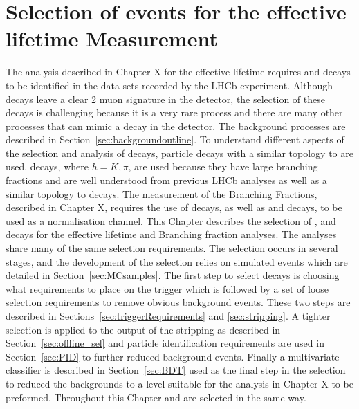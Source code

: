

\chapter{Selection of \bsmumu events for the effective lifetime Measurement}
\label{selection_chapter}
The analysis described in Chapter X for the \bsmumu effective lifetime requires \bsmumu and \bhh decays to be identified in the data sets recorded by the LHCb experiment. Although \bsmumu decays leave a clear 2 muon signature in the detector, the selection of these decays is challenging because it is a very rare process and there are many other processes that can mimic a \BsMuMu decay in the detector. The background processes are described in Section~\ref{sec:backgroundoutline}. To understand different aspects of the selection and analysis of \BsMuMu decays, particle decays with a similar topology to \BsMuMu are used. \bhh decays, where $h = K, \pi$, are used because they have large branching fractions and are well understood from previous LHCb analyses as well as a similar topology to \bsmumu decays. 
The measurement of the \bmumu Branching Fractions, described in Chapter X, requires the use of \bujpsik decays, as well as \bmumu and \bhh decays, to be used as a normalisation channel.
This Chapter describes the selection of \bmumu, \bhh and \bujpsik decays for the effective lifetime and Branching fraction analyses. The analyses share many of the same selection requirements. The selection occurs in several stages, and the development of the selection relies on simulated events which are detailed in Section~\ref{sec:MCsamples}. The first step to select decays is choosing what requirements to place on the trigger which is followed by a set of loose selection requirements to remove obvious background events. These two steps are described in Sections~\ref{sec:triggerRequirements} and \ref{sec:stripping}. A tighter selection is applied to the output of the stripping as described in Section~\ref{sec:offline_sel} and particle identification requirements are used in Section~\ref{sec:PID} to further reduced background events. Finally a multivariate classifier is described in Section~\ref{sec:BDT} used as the final step in the selection to reduced the backgrounds to a level suitable for the analysis in Chapter X to be preformed. Throughout this Chapter \bsmumu and \bdmumu are selected in the same way.

